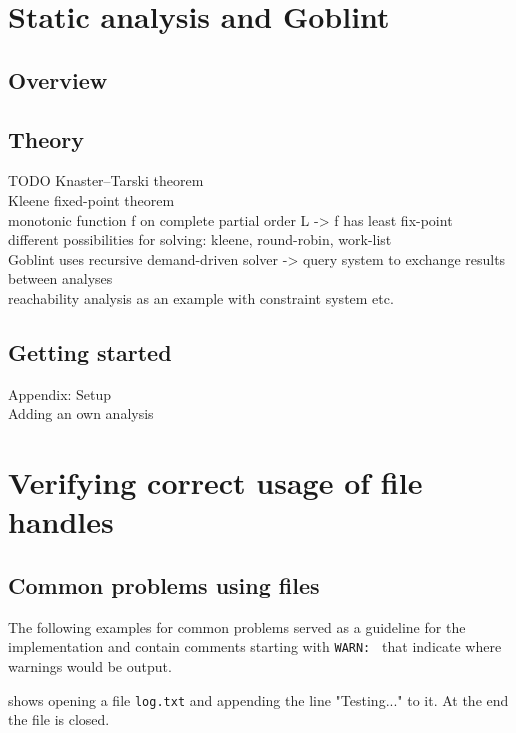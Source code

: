 


\chapter{Static analysis and Goblint}
\section{Overview}

\section{Theory} %
TODO
Knaster–Tarski theorem\\
Kleene fixed-point theorem\\
monotonic function f on complete partial order L -> f has least fix-point\\
different possibilities for solving: kleene, round-robin, work-list\\
Goblint uses recursive demand-driven solver -> query system to exchange results between analyses\\
reachability analysis as an example with constraint system etc.\\

\section{Getting started}
Appendix: Setup\\
Adding an own analysis


\chapter{Verifying correct usage of file handles}
\label{chap:file}
\section{Common problems using files}
The following examples for common problems served as a guideline for the implementation and contain comments starting with \verb|WARN: | that indicate where warnings would be output.

 shows opening a file \verb|log.txt| and appending the line "Testing..." to it. At the end the file is closed.

